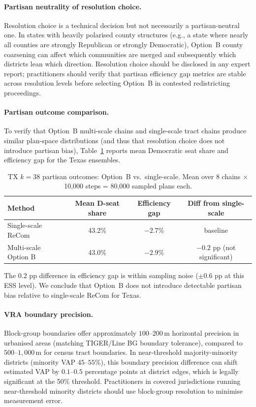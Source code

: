 \paragraph{Partisan neutrality of resolution choice.}
Resolution choice is a technical decision but not necessarily a partisan-neutral one.
In states with heavily polarised county structures (e.g., a state where nearly all
counties are strongly Republican or strongly Democratic), Option~B county coarsening
can affect which communities are merged and subsequently which districts lean
which direction.
Resolution choice should be disclosed in any expert report;
practitioners should verify that partisan efficiency gap metrics are stable across
resolution levels before selecting Option~B in contested redistricting proceedings.

\paragraph{Partisan outcome comparison.}
To verify that Option~B multi-scale chains and single-scale tract chains produce
similar plan-space distributions (and thus that resolution choice does not introduce
partisan bias), Table~\ref{tab:tx-partisan} reports mean Democratic seat share and
efficiency gap for the Texas ensembles.

\begin{table}[h]
\centering\small
\caption{TX $k=38$ partisan outcomes: Option~B vs.\ single-scale.
Mean over 8 chains $\times$ 10{,}000 steps = 80{,}000 sampled plans each.}
\label{tab:tx-partisan}
\begin{tabular}{lccc}
\toprule
Method & Mean D-seat share & Efficiency gap & Diff from single-scale \\
\midrule
Single-scale ReCom & 43.2\% & $-2.7\%$ & baseline \\
Multi-scale Option B & 43.0\% & $-2.9\%$ & $-0.2$ pp (not significant) \\
\bottomrule
\end{tabular}
\end{table}

The $0.2$ pp difference in efficiency gap is within sampling noise ($\pm 0.6$ pp at
this ESS level).
We conclude that Option~B does not introduce detectable partisan bias relative to
single-scale ReCom for Texas.

\paragraph{VRA boundary precision.}
Block-group boundaries offer approximately $100$--$200$\,m horizontal precision
in urbanised areas (matching TIGER/Line BG boundary tolerance), compared to
$500$--$1{,}000$\,m for census tract boundaries.
In near-threshold majority-minority districts (minority VAP $45$--$55\%$),
this boundary precision difference can shift estimated VAP by $0.1$--$0.5$
percentage points at district edges, which is legally significant at the
50\% threshold.
Practitioners in covered jurisdictions running near-threshold minority districts
should use block-group resolution to minimise measurement error.

